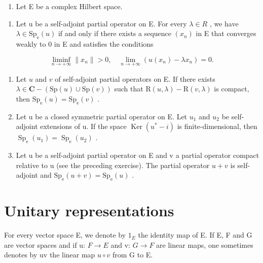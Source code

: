 \begin{enumerate}
\def\labelenumi{\arabic{enumi})}
\setcounter{enumi}{42}
\tightlist
\item
  Let E be a complex Hilbert space.
\end{enumerate}

\begin{enumerate}
\def\labelenumi{\alph{enumi})}
\tightlist
\item
  Let u be a self-adjoint partial operator on E. For every \(\lambda \in R\) , we have \(\lambda \in \mathrm{Sp}_{\mathrm{e}}(u)\) if and only if there exists a sequence \((x_{n})\) in E that converges weakly to 0 in E and satisfies the conditions
\end{enumerate}

\[
\liminf _ {n \to + \infty} \| x _ {n} \| > 0, \quad \lim _ {n \to + \infty} (u (x _ {n}) - \lambda x _ {n}) = 0.
\]

\begin{enumerate}
\def\labelenumi{\alph{enumi})}
\setcounter{enumi}{1}
\item
  Let \(u\) and \(v\) of self-adjoint partial operators on E. If there exists \(\lambda \in \mathbf{C} - (\mathrm{Sp}(u) \cup \mathrm{Sp}(v))\) such that \(\mathrm{R}(u, \lambda) - \mathrm{R}(v, \lambda)\) is compact, then \(\mathrm{Sp}_{\mathrm{e}}(u) = \mathrm{Sp}_{\mathrm{e}}(v)\) .
\item
  Let u be a closed symmetric partial operator on E. Let \(u_{1}\) and \(u_{2}\) be self-adjoint extensions of u. If the space \(\operatorname{Ker}(u^{*}-i)\) is finite-dimensional, then \(\operatorname{Sp}_{\mathrm{e}}(u_{1})=\operatorname{Sp}_{\mathrm{e}}(u_{2})\) .
\item
  Let u be a self-adjoint partial operator on E and v a partial operator compact relative to u (see the preceding exercise). The partial operator \(u + v\) is self-adjoint and \(\mathrm{Sp}_{\mathrm{e}}(u + v) = \mathrm{Sp}_{\mathrm{e}}(u)\) .
\end{enumerate}

\chapter{Unitary representations}
\setcounter{exercisepar}{0}

For every vector space E, we denote by \(1_{E}\) the identity map of E. If E, F and G are vector spaces and if u: \(F \rightarrow E\) and v: \(G \rightarrow F\) are linear maps, one sometimes denotes by uv the linear map \(u \circ v\) from G to E.

